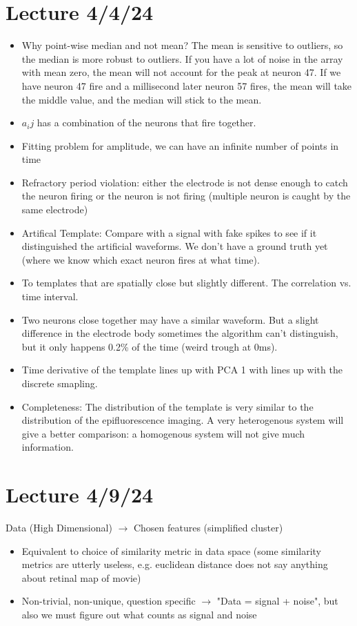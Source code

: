 \documentclass[../main.tex]{subfiles}
\begin{document}
\section*{Lecture 4/4/24}
\begin{itemize}
    \item Why point-wise median and not mean? The mean is sensitive to outliers, so the median is
    more robust to outliers. If you have a lot of noise in the array with mean zero, the mean will
    not account for the peak at neuron 47. If we have neuron 47 fire and a millisecond later neuron
    57 fires, the mean will take the middle value, and the median will stick to the mean.
    \item $a_ij$ has a combination of the neurons that fire together.
    \item Fitting problem for amplitude, we can have an infinite number of points in time
    \item Refractory period violation: either the electrode is not dense enough to catch the neuron
    firing or the neuron is not firing (multiple neuron is caught by the same electrode)
    \item Artifical Template: Compare with a signal with fake spikes to see if it distinguished the
    artificial waveforms. We don't have a ground truth yet (where we know which exact neuron fires
    at what time).
    \item To templates that are spatially close but slightly different. The correlation vs. time
    interval.
    \item Two neurons close together may have a similar waveform. But a slight difference in the 
    electrode body sometimes the algorithm can't distinguish, but it only happens 0.2\% of the time
    (weird trough at 0ms).
    \item Time derivative of the template lines up with PCA 1 with lines up with the discrete smapling.
    \item Completeness: The distribution of the template is very similar to the distribution of the 
    epifluorescence imaging. A very heterogenous system will give a better comparison: a homogenous
    system will not give much information. 
\end{itemize}

\newpage
\section*{Lecture 4/9/24}
Data (High Dimensional) $\to$ Chosen features (simplified cluster) 
\begin{itemize}
    \item Equivalent to choice of similarity metric in data space (some similarity metrics are
    utterly useless, e.g. euclidean distance does not say anything about retinal map of movie)
    \item Non-trivial, non-unique, question specific $\to$ "Data = signal + noise", but also we must
    figure out what counts as signal and noise
\end{itemize}
\end{document}
